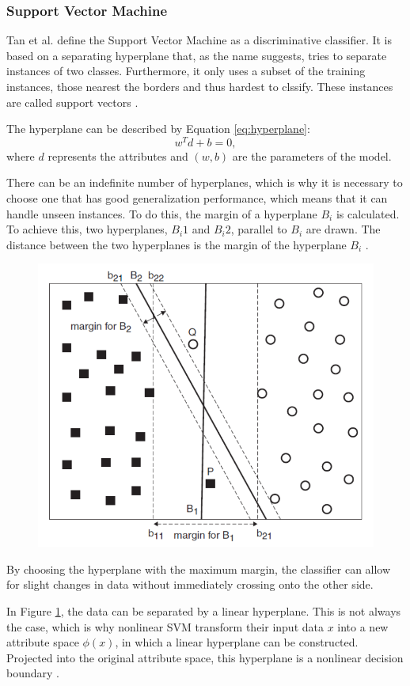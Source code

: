 \subsubsection{Support Vector Machine}
Tan et al. define the Support Vector Machine as a discriminative classifier. It is based on a separating hyperplane that, as the name suggests, tries to separate instances of two classes. Furthermore, it only uses a subset of the training instances, those nearest the borders and thus hardest to clssify. These instances are called support vectors \cite{DBLP:books/aw/TanSKK2019}.

The hyperplane can be described by Equation \eqref{eq:hyperplane}:
    \begin{equation}
            \label{eq:hyperplane}
                w^Td + b = 0,
        \end{equation}
    where $d$ represents the attributes and $(w, b)$ are the parameters of the model. 
    
    There can be an indefinite number of hyperplanes, which is why it is necessary to choose one that has good generalization performance, which means that it can handle unseen instances. To do this, the margin of a hyperplane $B_i$ is calculated. To achieve this, two hyperplanes, $B_i1$ and $B_i2$, parallel to $B_i$ are drawn. The distance between the two hyperplanes is the margin of the hyperplane $B_i$ \cite{DBLP:books/aw/TanSKK2019}.
    \begin{figure}
        \centering
        \caption{
        \label{fig:svm}
        }
        \includegraphics[scale=0.8]{Images/SVM_image.png}
    \end{figure}
    
    By choosing the hyperplane with the maximum margin, the classifier can allow for slight changes in data without immediately crossing onto the other side.
    
    In Figure \ref{fig:svm}, the data can be separated by a linear hyperplane. This is not always the case, which is why nonlinear SVM transform their input data $x$ into a new attribute space $\phi(x)$, in which a linear hyperplane can be constructed. Projected into the original attribute space, this hyperplane is a nonlinear decision boundary \cite{DBLP:books/aw/TanSKK2019}.
    